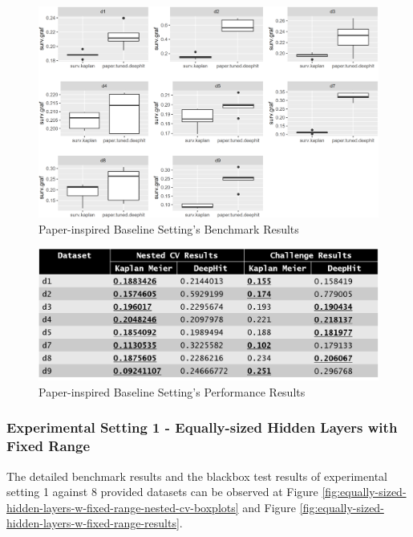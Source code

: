 \documentclass[
]{article}
\begin{document}
\begin{figure}

{\centering \includegraphics[width=0.8\linewidth]{paper-inspired-baseline-settings-nested-cv-boxplots} 

}

\caption{Paper-inspired Baseline Setting's Benchmark Results}\label{fig:paper-inspired-baseline-settings-nested-cv-boxplots}
\end{figure}

\begin{figure}

{\centering \includegraphics[width=0.8\linewidth]{paper-inspired-baseline-settings-results} 

}

\caption{Paper-inspired Baseline Setting's Performance Results}\label{fig:paper-inspired-baseline-settings-results}
\end{figure}

\hypertarget{ex1}{%
\subsubsection{Experimental Setting 1 - Equally-sized Hidden Layers with Fixed Range}\label{ex1}}

The detailed benchmark results and the blackbox test results of experimental setting 1 against 8 provided datasets can be observed at Figure \ref{fig:equally-sized-hidden-layers-w-fixed-range-nested-cv-boxplots} and Figure \ref{fig:equally-sized-hidden-layers-w-fixed-range-results}.
\end{document}
